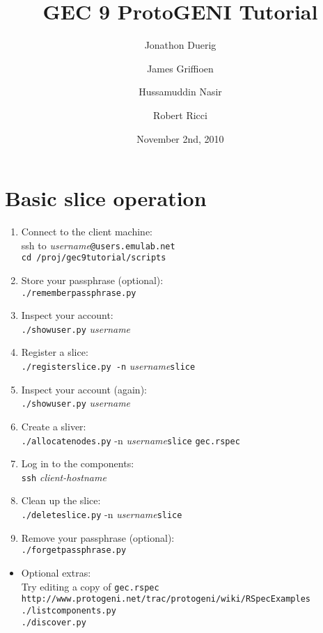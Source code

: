 \documentclass{article}
\title{GEC 9 ProtoGENI Tutorial}
\date{November 2nd, 2010}
\author{Jonathon Duerig \and James Griffioen \and Hussamuddin Nasir \and Robert Ricci}
\begin{document}
\maketitle
\thispagestyle{empty}
\pagestyle{empty}
\section{Basic slice operation}
\begin{enumerate}
\item Connect to the client machine:\\
ssh to \emph{username}{\tt @users.emulab.net}\\
{\tt cd /proj/gec9tutorial/scripts}
\item Store your passphrase (optional):\\
{\tt ./rememberpassphrase.py}
\item Inspect your account:\\
{\tt ./showuser.py} \emph{username}
\item Register a slice:\\
{\tt ./registerslice.py -n} \emph{username}{\tt slice}
\item Inspect your account (again):\\
{\tt ./showuser.py} \emph{username}
\item Create a sliver:\\
{\tt ./allocatenodes.py} -n \emph{username}{\tt slice} {\tt gec.rspec}
\item Log in to the components:\\
{\tt ssh} \emph{client-hostname}
\item Clean up the slice:\\
{\tt ./deleteslice.py} -n \emph{username}{\tt slice}
\item Remove your passphrase (optional):\\
{\tt ./forgetpassphrase.py}
\end{enumerate}
\begin{itemize}
\item Optional extras:\\
Try editing a copy of {\tt gec.rspec}\\
{\tt http://www.protogeni.net/trac/protogeni/wiki/RSpecExamples}\\
{\tt ./listcomponents.py}\\
{\tt ./discover.py}
\end{itemize}
\end{document}
